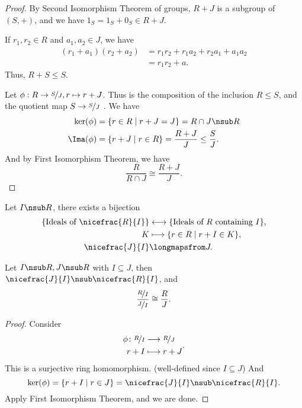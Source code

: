 \begin{proof}
    By Second Isomorphism Theorem of groups, \(R + J\) is a subgroup of \((S, +)\), and we have \(1_S = 1_S + 0_S \in R + J\).

    If \(r_1, r_2 \in R\) and \(a_1, a_2 \in J\), we have
    \begin{align*}
        (r_1 + a_1)(r_2 + a_2) &= r_{1}r_2 +r_1 a_2 + r_2 a_1 + a_1 a_{2}\\
        &= r_1 r_2 + a.
    \end{align*}
    Thus, \(R+S \leq S\).

    Let \(\phi: R \to \nicefrac{S}{J}, r \mapsto r + J\). Thus is the composition of the inclusion \(R\leq S\), and the quotient map \(S \to \nicefrac{S}{J}\) . We have
    \begin{align*}
        \ker(\phi) &= \{r\in R \mid r + J = J\} = R \cap J \nsub R\\
        \Ima(\phi) &= \{r + J \mid r \in R\} = \frac{R + J}{J} \leq \frac{S}{J}.
    \end{align*}
    And by First Isomorphism Theorem, we have
    \[
        \frac{R}{R \cap J} \cong \frac{R + J}{J}.
    \]
\end{proof}
\begin{note}
    Let \(I \nsub R\), there exists a bijection
    \begin{align*}
        \{\text{Ideals of }\nicefrac{R}{I}\} &\longleftrightarrow\{\text{Ideals of }R\text{ containing }I\},\\
        K &\longmapsto \{r\in R\mid r + I \in K\},\\
        \nicefrac{J}{I}&\longmapsfrom J.
    \end{align*}
\end{note}
\begin{theorem}
    Let \(I\nsub R, J \nsub R\) with \(I \subseteq J\), then \(\nicefrac{J}{I}\nsub \nicefrac{R}{I}\), and
    \[
        \frac{\nicefrac{R}{I}}{\nicefrac{J}{I}}\cong \frac{R}{J}.
    \]
\end{theorem}
\begin{proof}
    Consider
    \[
    \begin{aligned}
      \phi\colon \nicefrac{R}{I} & \longrightarrow \nicefrac{R}{J}      \\
      r+I          & \longmapsto r+J
    \end{aligned}.
    \]
    This is a surjective ring homomorphism. (well-defined since \(I \subseteq J\)) And
    \[
        \ker(\phi) = \{r + I \mid r \in J\} = \nicefrac{J}{I} \nsub \nicefrac{R}{I}.
    \]
    Apply First Isomorphism Theorem, and we are done.
\end{proof}
